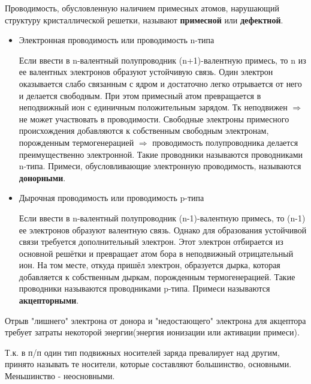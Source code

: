 Проводимость, обусловленную наличием примесных атомов, нарушающий структуру кристаллической решетки, называют \textbf{примесной} или \textbf{дефектной}.

\begin{itemize}
\item Электронная проводимость или проводимость n-типа

Если ввести в n-валентный полупроводник (n+1)-валентную примесь, то n из ее валентных электронов образуют устойчивую связь. Один электрон оказывается слабо связанным с ядром и достаточно легко отрывается от него и делается свободным. При этом примесный атом превращается в неподвижный ион с единичным положительным зарядом. Тк неподвижен $\Rightarrow$ не может участвовать в проводимости. Свободные электроны примесного происхождения добавляются к собственным свободным электронам, порожденным термогенерацией $\Rightarrow$ проводимость полупроводника делается преимущественно электронной. Такие проводники называются проводниками n-типа. Примеси, обусловливающие электронную проводимость, называются \textbf{донорными}.

\item Дырочная проводимость или проводимость p-типа

Если ввести в n-валентный полупроводник (n-1)-валентную примесь, то (n-1) ее электронов образуют валентную связь. Однако для образования устойчивой связи требуется дополнительный электрон. Этот электрон отбирается из основной решётки и превращает атом бора в неподвижный отрицательный ион. На том месте, откуда пришёл электрон, образуется дырка, которая добавляется к собственным дыркам, порожденным термогенерацией. Такие проводники называются проводниками p-типа. Примеси называются \textbf{акцепторными}. 
\end{itemize}

Отрыв "лишнего"  электрона от донора и "недостающего" электрона для акцептора требует затраты некоторой энергии(энергия ионизации или активации примеси). 

Т.к. в п/п один тип подвижных носителей заряда превалирует над другим, принято называть те носители, которые составляют большинство, основными. Меньшинство - неосновными.
